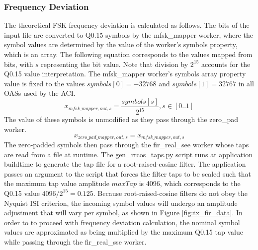 \subsubsection{Frequency Deviation}
The theoretical FSK frequency deviation is calculated as follows. The bits of the input file are converted to Q0.15 symbols by the mfsk\_mapper worker, where the symbol values are determined by the value of the worker's symbols property, which is an array. The following equation corresponds to the values mapped from bits, with $s$ representing the bit value. Note that division by $2^{15}$ accounts for the Q0.15 value interpretation. The mfsk\_mapper worker's symbols array property value is fixed to the values $symbols[0]=-32768$ and $symbols[1]=32767$ in all OASs used by the ACI.
	\begin{equation} \label{eq:map_out_val}
		x_{mfsk\_mapper,out,s}=\frac{symbols[s]}{2^{15}},
    s \in [0..1] %
	\end{equation}
The value of these symbols is unmodified as they pass through the zero\_pad worker.
	\begin{equation} \label{eq:zp_out_val}
		x_{zero\_pad\_mapper,out,s}=x_{mfsk\_mapper,out,s}
	\end{equation}
The zero-padded symbols then pass through the fir\_real\_see worker whose taps are read from a file at runtime. The gen\_rrcos\_taps.py script runs at application buildtime to generate the tap file for a root-raised-cosine filter. The application  passes an argument to the script that forces the filter taps to be scaled such that the maximum tap value amplitude $maxTap$ is 4096, which corresponds to the Q0.15 value $4096/2^{15}=0.125$. Because root-raised-cosine filters do not obey the Nyquist ISI criterion, the incoming symbol values will undergo an amplitude adjustment that will vary per symbol, as shown in Figure \ref{fig:tx_fir_data}. In order to to proceed with frequency deviation calculation, the nominal symbol values are approximated as being multiplied by the maximum Q0.15 tap value while passing through the fir\_real\_sse worker.
